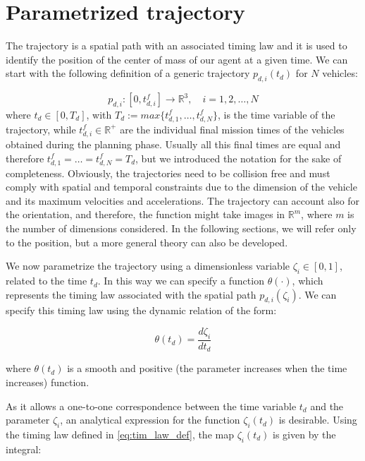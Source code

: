 \section{Parametrized trajectory\label{sec:parametrized_trajectory}}
The trajectory is a spatial path with an associated timing law and it is used
to identify the position of the center of mass of our agent at a given time.
We can start with the following definition of a generic trajectory $ p_{d,i}(t_d) $
for $ N $ vehicles:

\begin{equation}  \label{eq:traj_def}
  p_{d,i}:[0,t^f_{d,i}] \rightarrow \mathbb{R}^3, \quad i = 1,2,\dots,N
\end{equation}
where $ t_d \in [0, T_d] $, with $T_d := max \{ t^f_{d,1}, \dots , t^f_{d,N} \} $,
is the time variable of the trajectory, while $ t^f_{d,i} \in \mathbb{R}^+ $
are the individual final mission times of the vehicles obtained during the planning
phase. Usually all this final times are equal and therefore
$ t^f_{d,1} = \dots = t^f_{d,N} = T_d$, but we introduced the notation
for the sake of completeness.
Obviously, the trajectories need to be collision free and must comply with spatial
and temporal constraints due to the dimension of the vehicle and its maximum
velocities and accelerations.
The trajectory can account also for the orientation, and therefore, the function might take
images in $\mathbb{R}^m$, where $m$ is the number of dimensions considered.
In the following sections, we will refer only to the position, but a more general
theory can also be developed.

We now parametrize the trajectory using a dimensionless variable $ \zeta_i \in [0,1]$,
related to the time $t_d$. In this way we can specify a function $ \theta( \cdot )$,
which represents the timing law associated with the spatial path $p_{d,i}(\zeta_i)$.
We can specify this timing law using the dynamic relation of the form:

\begin{equation}  \label{eq:tim_law_def}
  \theta( t_d ) = \frac{d \zeta_i}{dt_d}
\end{equation}

where $ \theta( t_d ) $ is a smooth and positive (the parameter increases when
the time increases) function.

As it allows a one-to-one correspondence between the time
variable $t_d$ and the parameter $ \zeta_i $, an analytical expression
for the function $ \zeta_i (t_d) $ is desirable.
Using the timing law defined in \eqref{eq:tim_law_def}, the map $ \zeta_i ( t_d) $
is given by the integral:

